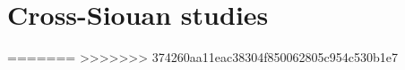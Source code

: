 \documentclass[output=short             %
	        ,collection
	        ,collectionchapter
	        ,collectiontoclongg
<<<<<<< HEAD
		,draft
		,draftmode
 	        ,biblatex  
		  ]{langsci/langscibook}                               %
\begin{document}
\part{Cross-Siouan studies}

=======
%
%
%
%
>>>>>>> 374260aa11eac38304f850062805c954c530b1e7




\end{document}
